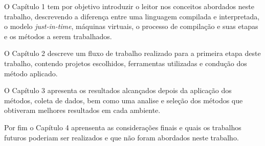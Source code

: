 O Capítulo 1 tem por objetivo introduzir o leitor nos conceitos abordados
 neste trabalho, descrevendo a diferença entre uma linguagem compilada e
 interpretada, o modelo \textit{just-in-time}, máquinas virtuais, o processo de compilação
 e suas etapas e os métodos a serem trabalhados.

O Capítulo 2 descreve um fluxo de trabalho realizado para a primeira etapa
 deste trabalho, contendo projetos escolhidos, ferramentas utilizadas e
 condução dos método aplicado.

O Capítulo 3 apresenta os resultados alcançados depois da aplicação dos métodos, coleta de dados,
 bem como uma analise e seleção dos métodos que obtiveram melhores resultados em cada ambiente.
 
Por fim o Capítulo 4 aprensenta as considerações finais e quais os trabalhos futuros
 poderiam ser realizados e que não foram abordados neste trabalho.
